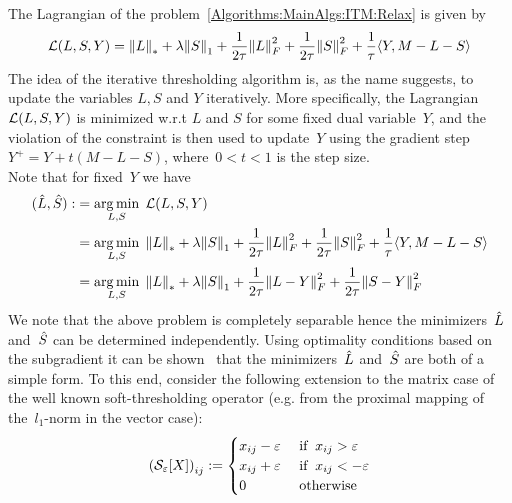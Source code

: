 The Lagrangian of the problem~\eqref{Algorithms:MainAlgs:ITM:Relax} is given by
%
\begin{align}
{\mathcal{L}}(L,S,Y) = {\left\|L\right\|}_{*}^{} + \lambda {\left\|S\right\|}_{1}^{} + \frac{1}{2\tau} {\left\|L\right\|}_{F}^{2} + \frac{1}{2\tau} {\left\|S\right\|}_{F}^{2} + \frac{1}{\tau} \langle Y, M-L-S \rangle
\label{Algorithms:MainAlgs:ITM:Lagr}
\end{align}
%
The idea of the iterative thresholding algorithm is, as the name suggests, to update the variables $L,S$ and $Y$ iteratively. More specifically, the Lagrangian ${\mathcal{L}}(L,S,Y)$ is minimized w.r.t $L$ and $S$ for some fixed dual variable~$Y$, and the violation of the constraint is then used to update~$Y$ using the gradient step~$Y^+ = Y + t (M-L-S)$, where~$0<t<1$ is the step size.\\

Note that for fixed~$Y$ we have
%
\begin{align}
\begin{split}
({\hat{L}},{\hat{S}}) :&= \operatorname*{arg\,min}_{L,S} \; {\mathcal{L}}(L,S,Y) \\
&= \operatorname*{arg\,min}_{L,S} \; {\left\|L\right\|}_{*}^{} + \lambda {\left\|S\right\|}_{1}^{} + \frac{1}{2\tau} {\left\|L\right\|}_{F}^{2} + \frac{1}{2\tau} {\left\|S\right\|}_{F}^{2} + \frac{1}{\tau} \langle Y, M-L-S \rangle \\
&= \operatorname*{arg\,min}_{L,S} \; {\left\|L\right\|}_{*}^{} + \lambda {\left\|S\right\|}_{1}^{} + \frac{1}{2\tau} {\left\|L-Y\right\|}_{F}^{2} + \frac{1}{2\tau} {\left\|S-Y\right\|}_{F}^{2}
\end{split}
\label{Algorithms:MainAlgs:ITM:ArgminLagr}
\end{align}
%
We note that the above problem is completely separable hence the minimizers~${\hat{L}}$ and~${\hat{S}}$ can be determined independently. Using optimality conditions based on the subgradient it can be shown~\cite{Cai:2010uq,Wright:2009fk} that the minimizers~${\hat{L}}$ and~${\hat{S}}$ are both of a simple form. To this end, consider the following 
extension to the matrix case of the well known soft-thresholding operator (e.g. from the proximal mapping of the~$l_1$-norm in the vector case):
%
\begin{align}
\left({\mathcal{S}}_\varepsilon[X]\right)_{ij} := \begin{cases} x_{ij}-\varepsilon & \text{ if} \;\; x_{ij}>\varepsilon \\ x_{ij}+\varepsilon & \text{ if} \;\; x_{ij}<-\varepsilon \\ 0 & \text{ otherwise} \end{cases}
\label{Algorithms:MainAlgs:ITM:Shrink}
\end{align}


